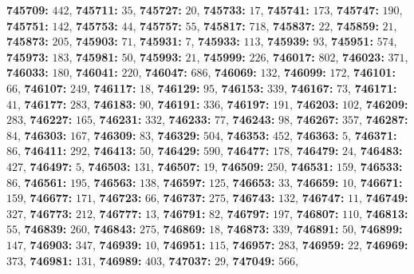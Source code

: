 \textsf{\bfseries 745709:} $442$, \textsf{\bfseries 745711:} $35$, \textsf{\bfseries 745727:} $20$, \textsf{\bfseries 745733:} $17$, \textsf{\bfseries 745741:} $173$, \textsf{\bfseries 745747:} $190$, \textsf{\bfseries 745751:} $142$, \textsf{\bfseries 745753:} $44$, \textsf{\bfseries 745757:} $55$, \textsf{\bfseries 745817:} $718$, \textsf{\bfseries 745837:} $22$, \textsf{\bfseries 745859:} $21$, \textsf{\bfseries 745873:} $205$, \textsf{\bfseries 745903:} $71$, \textsf{\bfseries 745931:} $7$, \textsf{\bfseries 745933:} $113$, \textsf{\bfseries 745939:} $93$, \textsf{\bfseries 745951:} $574$, \textsf{\bfseries 745973:} $183$, \textsf{\bfseries 745981:} $50$, \textsf{\bfseries 745993:} $21$, \textsf{\bfseries 745999:} $226$, \textsf{\bfseries 746017:} $802$, \textsf{\bfseries 746023:} $371$, \textsf{\bfseries 746033:} $180$, \textsf{\bfseries 746041:} $220$, \textsf{\bfseries 746047:} $686$, \textsf{\bfseries 746069:} $132$, \textsf{\bfseries 746099:} $172$, \textsf{\bfseries 746101:} $66$, \textsf{\bfseries 746107:} $249$, \textsf{\bfseries 746117:} $18$, \textsf{\bfseries 746129:} $95$, \textsf{\bfseries 746153:} $339$, \textsf{\bfseries 746167:} $73$, \textsf{\bfseries 746171:} $41$, \textsf{\bfseries 746177:} $283$, \textsf{\bfseries 746183:} $90$, \textsf{\bfseries 746191:} $336$, \textsf{\bfseries 746197:} $191$, \textsf{\bfseries 746203:} $102$, \textsf{\bfseries 746209:} $283$, \textsf{\bfseries 746227:} $165$, \textsf{\bfseries 746231:} $332$, \textsf{\bfseries 746233:} $77$, \textsf{\bfseries 746243:} $98$, \textsf{\bfseries 746267:} $357$, \textsf{\bfseries 746287:} $84$, \textsf{\bfseries 746303:} $167$, \textsf{\bfseries 746309:} $83$, \textsf{\bfseries 746329:} $504$, \textsf{\bfseries 746353:} $452$, \textsf{\bfseries 746363:} $5$, \textsf{\bfseries 746371:} $86$, \textsf{\bfseries 746411:} $292$, \textsf{\bfseries 746413:} $50$, \textsf{\bfseries 746429:} $590$, \textsf{\bfseries 746477:} $178$, \textsf{\bfseries 746479:} $24$, \textsf{\bfseries 746483:} $427$, \textsf{\bfseries 746497:} $5$, \textsf{\bfseries 746503:} $131$, \textsf{\bfseries 746507:} $19$, \textsf{\bfseries 746509:} $250$, \textsf{\bfseries 746531:} $159$, \textsf{\bfseries 746533:} $86$, \textsf{\bfseries 746561:} $195$, \textsf{\bfseries 746563:} $138$, \textsf{\bfseries 746597:} $125$, \textsf{\bfseries 746653:} $33$, \textsf{\bfseries 746659:} $10$, \textsf{\bfseries 746671:} $159$, \textsf{\bfseries 746677:} $171$, \textsf{\bfseries 746723:} $66$, \textsf{\bfseries 746737:} $275$, \textsf{\bfseries 746743:} $132$, \textsf{\bfseries 746747:} $11$, \textsf{\bfseries 746749:} $327$, \textsf{\bfseries 746773:} $212$, \textsf{\bfseries 746777:} $13$, \textsf{\bfseries 746791:} $82$, \textsf{\bfseries 746797:} $197$, \textsf{\bfseries 746807:} $110$, \textsf{\bfseries 746813:} $55$, \textsf{\bfseries 746839:} $260$, \textsf{\bfseries 746843:} $275$, \textsf{\bfseries 746869:} $18$, \textsf{\bfseries 746873:} $339$, \textsf{\bfseries 746891:} $50$, \textsf{\bfseries 746899:} $147$, \textsf{\bfseries 746903:} $347$, \textsf{\bfseries 746939:} $10$, \textsf{\bfseries 746951:} $115$, \textsf{\bfseries 746957:} $283$, \textsf{\bfseries 746959:} $22$, \textsf{\bfseries 746969:} $373$, \textsf{\bfseries 746981:} $131$, \textsf{\bfseries 746989:} $403$, \textsf{\bfseries 747037:} $29$, \textsf{\bfseries 747049:} $566$, 
